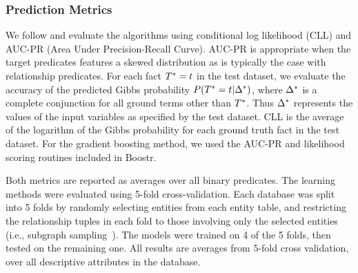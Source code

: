 \documentclass[runningheads,a4paper]{llncs}
\begin{document}
\subsubsection{Prediction Metrics}
We follow \cite{Khot2011} and evaluate the algorithms using conditional log likelihood (CLL) and AUC-PR (Area Under Precision-Recall Curve). AUC-PR is appropriate when the target predicates features a skewed distribution as is typically the case with relationship predicates. %
For each fact $T^{*}\hspace{0.0ex} = t$ in the test dataset, we evaluate the accuracy of the predicted Gibbs probability $P(T^{*}\hspace{0.0ex} = t | \Delta^{*}\hspace{0.0ex})$, where $\Delta^{*}\hspace{0.0ex}$ is a complete conjunction for all ground terms other than $T^{*}\hspace{0.0ex}$. Thus $\Delta^{*}\hspace{0.0ex}$ represents the values of the input variables as specified by the test dataset.
CLL is the average of the logarithm of the Gibbs probability for each ground truth fact in the test dataset. For the gradient boosting method, we used the AUC-PR and likelihood scoring routines included in Boostr.


Both metrics are reported as averages over all binary predicates. The learning methods were evaluated using 5-fold cross-validation. Each database was split into 5 folds by randomly selecting entities from each entity table, and restricting the relationship tuples in each fold to those involving only the selected entities  (i.e., subgraph sampling~\cite{Schulte2012}). The models were trained on 4 of the 5 folds, then tested on the remaining one. All results are averages from 5-fold cross validation, over all descriptive attributes in the database. 
\end{document}
